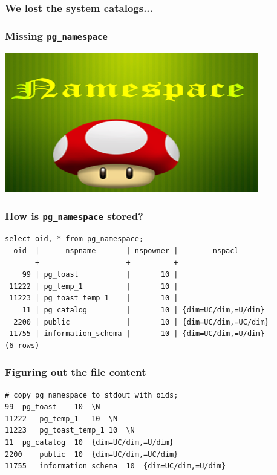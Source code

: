 \documentclass{beamer}
\begin{document}
\begin{frame}[fragile]
  \frametitle{We lost the system catalogs...}

  \vfill
\end{frame}


\begin{frame}[fragile]
  \frametitle{Missing \texttt{pg\_namespace}}

  \vfill
  
  \begin{center}
    \includegraphics[height=2.4in]{namespace1.png}
  \end{center}
\end{frame}

\begin{frame}[fragile]
  \frametitle{How is \texttt{pg\_namespace} stored?}
  
  \begin{verbatim}
select oid, * from pg_namespace;
  oid  |      nspname       | nspowner |        nspacl        
-------+--------------------+----------+----------------------
    99 | pg_toast           |       10 | 
 11222 | pg_temp_1          |       10 | 
 11223 | pg_toast_temp_1    |       10 | 
    11 | pg_catalog         |       10 | {dim=UC/dim,=U/dim}
  2200 | public             |       10 | {dim=UC/dim,=UC/dim}
 11755 | information_schema |       10 | {dim=UC/dim,=U/dim}
(6 rows)
  \end{verbatim}
\end{frame}

\begin{frame}[fragile=singleslide]
  \frametitle{Figuring out the file content}
  
  \begin{verbatim}
# copy pg_namespace to stdout with oids;
99	pg_toast	10	\N
11222	pg_temp_1	10	\N
11223	pg_toast_temp_1	10	\N
11	pg_catalog	10	{dim=UC/dim,=U/dim}
2200	public	10	{dim=UC/dim,=UC/dim}
11755	information_schema	10	{dim=UC/dim,=U/dim}
  \end{verbatim}
\end{frame}
\end{document}
